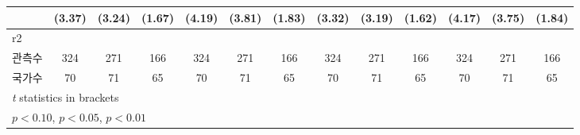 \begin{table}[htbp]
{\begin{tabular}{l*{12}{c}}
                    &      (3.37)         &      (3.24)         &      (1.67)         &      (4.19)         &      (3.81)         &      (1.83)         &      (3.32)         &      (3.19)         &      (1.62)         &      (4.17)         &      (3.75)         &      (1.84)         \\
\midrule
r2                  &                     &                     &                     &                     &                     &                     &                     &                     &                     &                     &                     &                     \\
관측수                   &         324         &         271         &         166         &         324         &         271         &         166         &         324         &         271         &         166         &         324         &         271         &         166         \\
국가수                 &          70         &          71         &          65         &          70         &          71         &          65         &          70         &          71         &          65         &          70         &          71         &          65         \\
\bottomrule
\multicolumn{13}{l}{\footnotesize \textit{t} statistics in brackets}\\
\multicolumn{13}{l}{\footnotesize \sym{*} \(p<0.10\), \sym{**} \(p<0.05\), \sym{***} \(p<0.01\)}\\
\end{tabular}}
\end{table}
